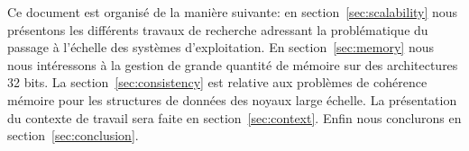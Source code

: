   \hspace{1cm}Ce document est organisé de la manière suivante: en
  section~\ref{sec:scalability} nous présentons les différents travaux de
  recherche adressant la problématique du passage à l'échelle des systèmes
  d'exploitation. En section~\ref{sec:memory} nous nous intéressons à la gestion
  de grande quantité de mémoire sur des architectures 32 bits. La
  section~\ref{sec:consistency} est relative aux problèmes de cohérence mémoire
  pour les structures de données des noyaux large échelle. La présentation du
  contexte de travail sera faite en section~\ref{sec:context}. Enfin nous
  conclurons en section~\ref{sec:conclusion}.\newline
